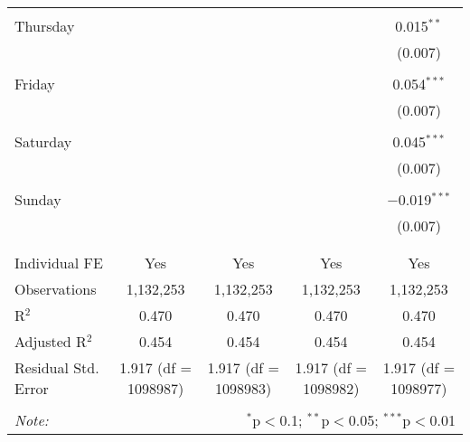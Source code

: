 \documentclass[
]{article}
\begin{document}
\begin{table}[!htbp]
{\begin{tabular}{@{\extracolsep{5pt}}lcccc}
  & & & & \\ 
 Thursday &  &  &  & 0.015$^{**}$ \\ 
  &  &  &  & (0.007) \\ 
  & & & & \\ 
 Friday &  &  &  & 0.054$^{***}$ \\ 
  &  &  &  & (0.007) \\ 
  & & & & \\ 
 Saturday &  &  &  & 0.045$^{***}$ \\ 
  &  &  &  & (0.007) \\ 
  & & & & \\ 
 Sunday &  &  &  & $-$0.019$^{***}$ \\ 
  &  &  &  & (0.007) \\ 
  & & & & \\ 
\hline \\[-1.8ex] 
Individual FE & Yes & Yes & Yes & Yes \\ 
Observations & 1,132,253 & 1,132,253 & 1,132,253 & 1,132,253 \\ 
R$^{2}$ & 0.470 & 0.470 & 0.470 & 0.470 \\ 
Adjusted R$^{2}$ & 0.454 & 0.454 & 0.454 & 0.454 \\ 
Residual Std. Error & 1.917 (df = 1098987) & 1.917 (df = 1098983) & 1.917 (df = 1098982) & 1.917 (df = 1098977) \\ 
\hline 
\hline \\[-1.8ex] 
\textit{Note:}  & \multicolumn{4}{r}{$^{*}$p$<$0.1; $^{**}$p$<$0.05; $^{***}$p$<$0.01} \\ 
\end{tabular}
} 
\end{table} 
\newpage
\end{document}
